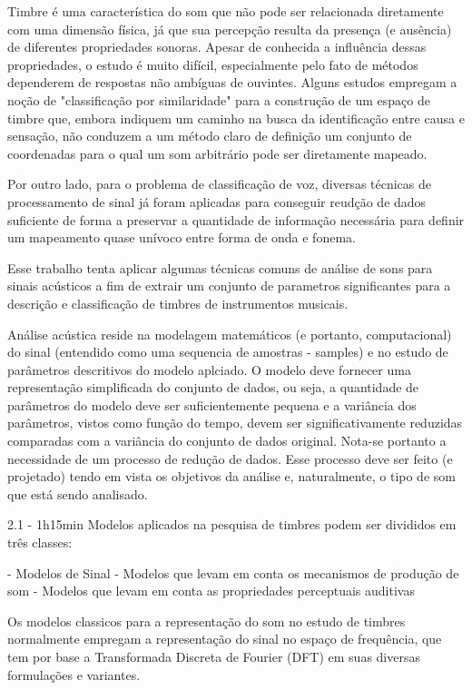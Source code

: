 Timbre é uma característica do som que não pode ser relacionada diretamente
com uma dimensão física, já que sua percepção resulta da presença (e ausência)
de diferentes propriedades sonoras. Apesar de conhecida a influência dessas
propriedades, o estudo é muito difícil, especialmente pelo fato de métodos
dependerem de respostas não ambíguas de ouvintes. Alguns estudos empregam a
noção de "classificação por similaridade" para a construção de um espaço de
timbre que, embora indiquem um caminho na busca da identificação entre causa e
sensação, não conduzem a um método claro de definição um conjunto de
coordenadas para o qual um som arbitrário pode ser diretamente mapeado.

Por outro lado, para o problema de classificação de voz, diversas técnicas de
processamento de sinal já foram aplicadas para conseguir reudção de dados
suficiente de forma a preservar a quantidade de informação necessária para
definir um mapeamento quase unívoco entre forma de onda e fonema.

Esse trabalho tenta aplicar algumas técnicas comuns de análise de sons para
sinais acústicos a fim de extrair um conjunto de parametros significantes para
a descrição e classificação de timbres de instrumentos musicais.

Análise acústica reside na modelagem matemáticos (e portanto, computacional) do
sinal (entendido como uma sequencia de amostras - samples) e no estudo de
parâmetros descritivos do modelo aplciado. O modelo deve fornecer uma
representação simplificada do conjunto de dados, ou seja, a quantidade de
parâmetros do modelo deve ser suficientemente pequena e a variância dos
parâmetros, vistos como função do tempo, devem ser significativamente
reduzidas comparadas com a variância do conjunto de dados original. Nota-se
portanto a necessidade de um processo de redução de dados. Esse processo deve
ser feito (e projetado) tendo em vista os objetivos da análise e,
naturalmente, o tipo de som que está sendo analisado. 

2.1 - 1h15min
Modelos aplicados na pesquisa de timbres podem ser divididos em três classes:

- Modelos de Sinal
- Modelos que levam em conta os mecanismos de produção de som
- Modelos que levam em conta as propriedades perceptuais auditivas

Os modelos classicos para a representação do som no estudo de timbres
normalmente empregam a representação do sinal no espaço de frequência, que tem
por base a Transformada Discreta de Fourier (DFT) em suas diversas formulações
e variantes. 

